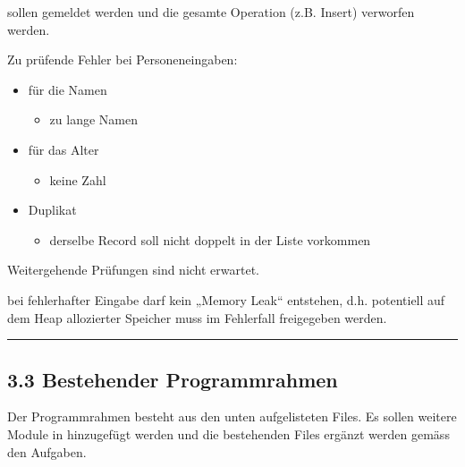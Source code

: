 \documentclass[a4paper,10pt,english]{report}
\begin{document}
\sphinxAtStartPar
{} sollen gemeldet werden und die gesamte Operation (z.B. Insert) verworfen werden.

\sphinxAtStartPar
Zu prüfende Fehler bei Personeneingaben:
\begin{itemize}
\item {} 
\sphinxAtStartPar
für die Namen
\begin{itemize}
\item {} 
\sphinxAtStartPar
zu lange Namen

\end{itemize}

\item {} 
\sphinxAtStartPar
für das Alter
\begin{itemize}
\item {} 
\sphinxAtStartPar
keine Zahl

\end{itemize}

\item {} 
\sphinxAtStartPar
Duplikat
\begin{itemize}
\item {} 
\sphinxAtStartPar
derselbe Record soll nicht doppelt in der Liste vorkommen

\end{itemize}

\end{itemize}

\sphinxAtStartPar
Weitergehende Prüfungen sind nicht erwartet.

\sphinxAtStartPar
{} bei fehlerhafter Eingabe darf kein „Memory Leak“ entstehen, d.h. potentiell auf dem Heap allozierter Speicher muss im Fehlerfall freigegeben werden.


\bigskip\hrule\bigskip



\subsection{3.3	Bestehender Programmrahmen}
\label{\detokenize{P06_Personen_Verwaltung_Linked_List/README:bestehender-programmrahmen}}
\sphinxAtStartPar
Der Programmrahmen besteht aus den unten aufgelisteten Files. Es sollen weitere Module in  hinzugefügt werden und die bestehenden Files ergänzt werden gemäss den Aufgaben.
\end{document}
